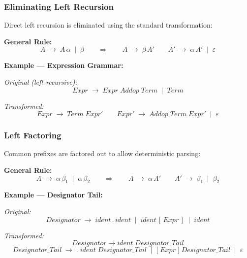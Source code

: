 \documentclass[11pt,a4paper]{article}
\begin{document}
\subsubsection{Eliminating Left Recursion}

Direct left recursion is eliminated using the standard transformation:

\begin{tcolorbox}[colback=LightBlack!30, colframe=PrimaryBlack, arc=3pt, boxrule=0.6pt]
\textbf{General Rule:}
\[
  A \;\rightarrow\; A\,\alpha \;\mid\; \beta
  \qquad\Longrightarrow\qquad
  A \;\rightarrow\; \beta\,A' \qquad A' \;\rightarrow\; \alpha\,A' \;\mid\; \varepsilon
\]
\end{tcolorbox}

\medskip
\textbf{Example — Expression Grammar:}

\noindent\textit{Original (left-recursive):}
\[
  \textit{Expr} \;\rightarrow\; \textit{Expr}\;\textit{Addop}\;\textit{Term} \;\mid\; \textit{Term}
\]

\noindent\textit{Transformed:}
\[
  \textit{Expr}  \;\rightarrow\; \textit{Term}\;\textit{Expr}'
  \qquad
  \textit{Expr}' \;\rightarrow\; \textit{Addop}\;\textit{Term}\;\textit{Expr}' \;\mid\; \varepsilon
\]

\subsubsection{Left Factoring}

Common prefixes are factored out to allow deterministic parsing:

\begin{tcolorbox}[colback=LightBlack!30, colframe=PrimaryBlack, arc=3pt, boxrule=0.6pt]
\textbf{General Rule:}
\[
  A \;\rightarrow\; \alpha\,\beta_1 \;\mid\; \alpha\,\beta_2
  \qquad\Longrightarrow\qquad
  A \;\rightarrow\; \alpha\,A' \qquad A' \;\rightarrow\; \beta_1 \;\mid\; \beta_2
\]
\end{tcolorbox}

\medskip
\textbf{Example — Designator Tail:}

\noindent\textit{Original:}
\[
  \textit{Designator} \;\rightarrow\; \textit{ident}\,.\,\textit{ident}
    \;\mid\; \textit{ident}\,[\,\textit{Expr}\,]
    \;\mid\; \textit{ident}
\]

\noindent\textit{Transformed:}
\[
  \textit{Designator}      \;\rightarrow\; \textit{ident}\;\textit{Designator\_Tail}
\]
\[
  \textit{Designator\_Tail} \;\rightarrow\;
    \mathtt{.}\;\textit{ident}\;\textit{Designator\_Tail}
    \;\mid\; \mathtt{[}\;\textit{Expr}\;\mathtt{]}\;\textit{Designator\_Tail}
    \;\mid\; \varepsilon
\]
\end{document}
